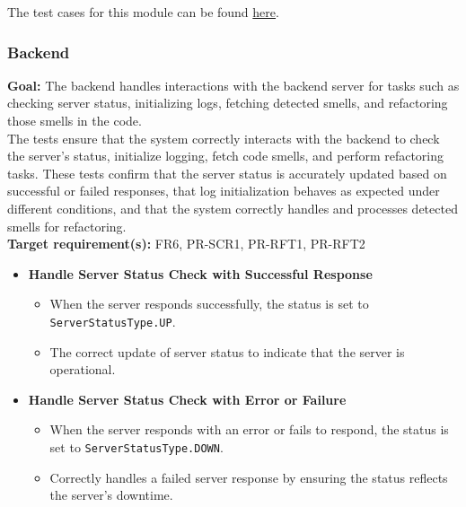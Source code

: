 \documentclass[12pt, titlepage]{article}
\begin{document}
\begin{enumerate}[label={\bf \textcolor{Maroon}{test-SRT-\arabic*}}, wide=0pt, font=\itshape]
\noindent The test cases for this module can be found \href{https://github.com/ssm-lab/capstone--sco-vs-code-plugin/blob/plugin-multi-file/test/commands/wipeWorkCache.test.ts}{here}.

\subsubsection{Backend}

\textbf{Goal:} The backend handles interactions with the backend server for tasks such as checking server status, initializing logs, fetching detected smells, and refactoring those smells in the code.\\

\noindent The tests ensure that the system correctly interacts with the backend to check the server's status, initialize logging, fetch code smells, and perform refactoring tasks. These tests confirm that the server status is accurately updated based on successful or failed responses, that log initialization behaves as expected under different conditions, and that the system correctly handles and processes detected smells for refactoring.\\


\noindent \textbf{Target requirement(s):} FR6, PR-SCR1, PR-RFT1, PR-RFT2~\cite{SRS} \\

\begin{itemize}
    \item \textbf{Handle Server Status Check with Successful Response}
    \begin{itemize}
        \item When the server responds successfully, the status is set to \texttt{ServerStatusType.UP}.
        \item The correct update of server status to indicate that the server is operational.
    \end{itemize}

    \item \textbf{Handle Server Status Check with Error or Failure}
    \begin{itemize}
        \item When the server responds with an error or fails to respond, the status is set to \texttt{ServerStatusType.DOWN}.
        \item Correctly handles a failed server response by ensuring the status reflects the server's downtime.
    \end{itemize}


\end{itemize}
\end{enumerate}
\end{document}

